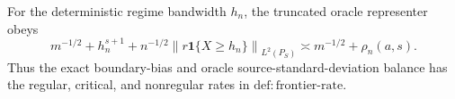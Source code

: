 For the deterministic regime bandwidth \(h_n\), the truncated oracle representer obeys \[m^{-1/2}+h_n^{s+1}+n^{-1/2}\left\|r\mathbf 1\{X\ge h_n\}\right\|_{L^2(P_S)}\asymp m^{-1/2}+\rho_n(a,s).\] Thus the exact boundary-bias and oracle source-standard-deviation balance has the regular, critical, and nonregular rates in \(\mathrm{def:frontier\text{-}rate}\).